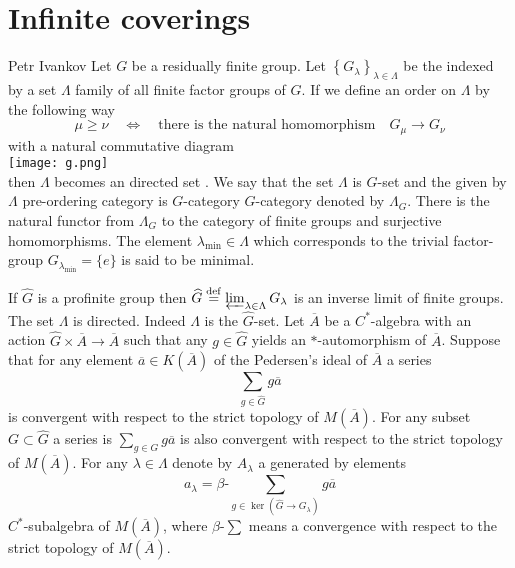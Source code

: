 \documentclass{beamer}
\theoremstyle{plain}
\newcommand{\be}{\begin{equation}}
\newcommand{\ee}{\end{equation}}
\newcommand{\la}{\lambda}
\newcommand{\La}{\Lambda}
\newcommand{\bt}{\beta}           %
\newcommand{\bydef}{\stackrel{\mathrm{def}}{=}}
\begin{document}
\section{Infinite coverings}
\begin{frame}
 \begin{definition}\label{g_category_defn}\alert{Petr Ivankov}
	Let $ G$ be a residually finite group. 
	Let $\left\{G_\la\right\}_{\la\in \La}$ be the indexed by a set $\La$ family of all finite factor groups of $ G$. If we define an order on $\La$ by the following way
	\be\label{top_group_order_eqn}
	\mu \ge \nu \quad \Leftrightarrow \quad \text{there is the natural homomorphism} \quad G_\mu \to G_\nu
	\ee
	with a natural commutative diagram
	\\
	\texttt{[image: g.png]}
	\\
	then $\La$ becomes an directed set . We say that the set $\La$ is $  G$-\alert{set} and the given by $\La$ pre-ordering category  is $  G$-\alert{category}  $  G$-{category} denoted by $\La_{ G }$.
	There is the natural functor from $\La_{ G }$ to the category of finite groups and surjective homomorphisms. The element $\la_{\min }\in \La$ which corresponds to the trivial factor-group $G_{\la_{\min}}= \{e\}$ is said to be \alert{minimal}.
\end{definition}
\end{frame}
\begin{frame}
 	If  $\widehat{G}$ is a profinite group   then 
$\widehat{G} \bydef \varprojlim_{\la \in \La}  G_\la$ is an inverse limit of finite groups. The set $\La$ is directed. Indeed $\La$ is the $\widehat{G}$-set. Let $\overline A$ be a $C^*$-algebra with an action $\widehat{G}\times \overline A\to \overline A$ such that any $ g \in \widehat G$ yields an $*$-automorphism of $\overline A$.	  
Suppose that for any element $\overline a \in K\left(\overline A \right)$ of the Pedersen's ideal of $\overline A$  a series 
\be\label{infinite_covering_basic_eqn}
\sum_{	g \in \widehat{G}}g \overline a
\ee
is convergent with respect to the strict topology of $M\left(\overline A\right)$. For any subset $G \subset \widehat{G}$ a series is $	\sum_{	g \in {G}}g \overline a$ is also convergent with respect to the strict topology of $M\left(\overline A\right)$. For any $\la \in \La$ denote by $A_\la$ a generated by elements
\be\label{basic_cov_cl_eqn}
a_\la =\bt\text{-} \sum_{	g \in \ker\left( \widehat{G}\to G_\la\right) }g \overline a
\ee
$C^*$-subalgebra of $M\left(\overline A\right)$, where  $\bt\text{-} \sum$ means a convergence  with respect to the strict topology of $M\left(\overline A\right)$. 
\end{frame}
\end{document}
